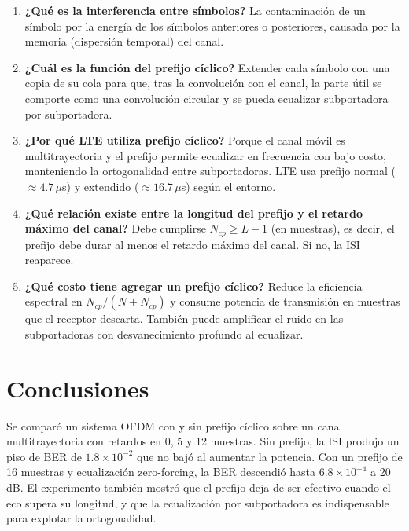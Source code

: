 \documentclass[11pt,a4paper]{article}
\begin{document}
\begin{enumerate}
  \item \textbf{¿Qué es la interferencia entre símbolos?} La contaminación de un símbolo
        por la energía de los símbolos anteriores o posteriores, causada por la memoria
        (dispersión temporal) del canal.
  \item \textbf{¿Cuál es la función del prefijo cíclico?} Extender cada símbolo con una
        copia de su cola para que, tras la convolución con el canal, la parte útil se
        comporte como una convolución circular y se pueda ecualizar subportadora por
        subportadora.
  \item \textbf{¿Por qué LTE utiliza prefijo cíclico?} Porque el canal móvil es
        multitrayectoria y el prefijo permite ecualizar en frecuencia con bajo costo,
        manteniendo la ortogonalidad entre subportadoras. LTE usa prefijo normal
        ($\approx4.7\,\mu$s) y extendido ($\approx16.7\,\mu$s) según el entorno.
  \item \textbf{¿Qué relación existe entre la longitud del prefijo y el retardo máximo del
        canal?} Debe cumplirse $N_{cp}\ge L-1$ (en muestras), es decir, el prefijo debe
        durar al menos el retardo máximo del canal. Si no, la ISI reaparece.
  \item \textbf{¿Qué costo tiene agregar un prefijo cíclico?} Reduce la eficiencia
        espectral en $N_{cp}/(N+N_{cp})$ y consume potencia de transmisión en muestras que
        el receptor descarta. También puede amplificar el ruido en las subportadoras con
        desvanecimiento profundo al ecualizar.
\end{enumerate}

\section{Conclusiones}

Se comparó un sistema OFDM con y sin prefijo cíclico sobre un canal multitrayectoria con
retardos en 0, 5 y 12 muestras. Sin prefijo, la ISI produjo un piso de BER de
$1.8\times10^{-2}$ que no bajó al aumentar la potencia. Con un prefijo de 16 muestras y
ecualización zero-forcing, la BER descendió hasta $6.8\times10^{-4}$ a 20 dB. El
experimento también mostró que el prefijo deja de ser efectivo cuando el eco supera su
longitud, y que la ecualización por subportadora es indispensable para explotar la
ortogonalidad.
\end{document}
